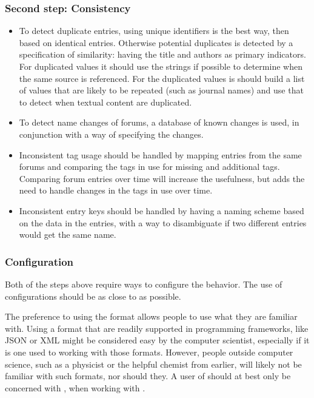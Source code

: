 \subsubsection{Second step: Consistency}
\begin{itemize}
\item To detect duplicate entries, using unique identifiers is the
  best way, then based on identical entries.  Otherwise potential
  duplicates is detected by a specification of similarity: having the
  title and authors as primary indicators.  For duplicated values it
  should use the strings if possible to determine when the same source
  is referenced.  For the duplicated values is should build a list of
  values that are likely to be repeated (such as journal names) and
  use that to detect when textual content are duplicated.

\item To detect name changes of forums, a database of known changes is
  used, in conjunction with a way of specifying the changes.

\item Inconsistent tag usage should be handled by mapping entries from
  the same forums and comparing the tags in use for missing and
  additional tags.  Comparing forum entries over time will increase
  the usefulness, but adds the need to handle changes in the tags in
  use over time.

\item Inconsistent entry keys should be handled by having a naming
  scheme based on the data in the entries, with a way to disambiguate
  if two different entries would get the same name.
\end{itemize}


\subsubsection{Configuration}
\label{sec:analyzing_configuration}

Both of the steps above require ways to configure the behavior.  The
use of configurations should be as close to {\bibtex} as possible.

The preference to using the {\bibtex} format allows people to use what
they are familiar with.  Using a format that are readily supported in
programming frameworks, like JSON or XML might be considered easy by
the computer scientist, especially if it is one used to working with
those formats.  However, people outside computer science, such as a
physicist or the helpful chemist from earlier, will likely not be
familiar with such formats, nor should they.  A user of {\bibtex}
should at best only be concerned with {\bibtex}, when working with
{\bibtex}.

